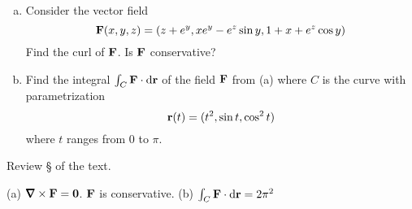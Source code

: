 \begin{question}[M317 2013D] %

\begin{enumerate}[(a)]
\item
Consider the vector field
\begin{equation*}
\mathbf{F}(x, y, z) = \left(z + e^y , xe^y - e^z \sin y, 1 + x + e^z \cos y\right)
\end{equation*}
Find the curl of $\mathbf{F}$. Is $\mathbf{F}$ conservative?
\item
Find the integral $\int_C \mathbf{F} \cdot \mathrm{d}\mathbf{r}$ of the field 
$\mathbf{F}$ from (a) where $C$ is the curve with parametrization
\begin{equation*}
\mathbf{r}(t) = (t^2 , \sin t, \cos^2 t)
\end{equation*}
where $t$ ranges from $0$ to $\pi$.
\end{enumerate}
\end{question}

\begin{hint} 
Review \S{} of the  text.
\end{hint}

\begin{answer} 
(a) $\vnabla\times\vF=\vZero$. $\mathbf{F}$ is conservative.\qquad
(b) $\int_C \mathbf{F} \cdot \mathrm{d}\mathbf{r}=2\pi^2$

\end{answer}


